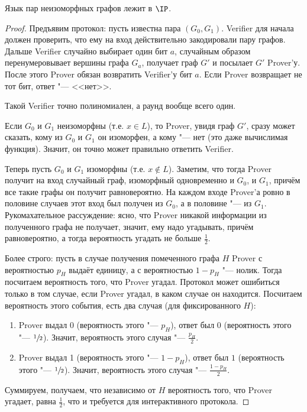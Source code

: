 	\begin{theorem}
		Язык пар неизоморфных графов лежит в $\IP$.
	\end{theorem}
	\begin{proof}
		Предъявим протокол: пусть известна пара $(G_0, G_1)$.
		Verifier для начала должен проверить, что ему на вход действительно закодировали пару графов.
		Дальше Verifier случайно выбирает один бит $a$, случайным образом перенумеровывает вершины графа $G_a$, получает граф $G'$ и посылает $G'$ Prover'у.
		После этого Prover обязан возвратить Verifier'у бит $a$.
		Если Prover возвращает не тот бит, ответ "--- <<нет>>.
		
		Такой Verifier точно полиномиален, а раунд вообще всего один.

		Если $G_0$ и $G_1$ неизоморфны (т.е. $x \in L$), то Prover, увидя граф $G'$, сразу может сказать, кому из $G_0$ и $G_1$ он изоморфен, а кому "--- нет (это даже вычислимая функция).
		Значит, он точно может правильно ответить Verifier.

		Теперь пусть $G_0$ и $G_1$ изоморфны (т.е. $x \notin L$).
		Заметим, что тогда Prover получит на вход случайный граф, изоморфный одновременно и $G_0$, и $G_1$, причём все такие графы он получит равновероятно.
		На каждом входе Prover'а ровно в половине случаев этот вход был получен из $G_0$, а в половине "--- из $G_1$.
		Рукомахательное рассуждение: ясно, что Prover никакой информации из полученного графа не получает, значит, ему надо угадывать, причём равновероятно, а тогда вероятность угадать не больше $\frac 12$.

		Более строго:
		пусть в случае получения помеченного графа $H$ Prover с вероятностью $p_{H}$ выдаёт единицу, а с вероятностью $1-p_{H}$ "--- нолик.
		Тогда посчитаем вероятность того, что Prover угадал.
		Протокол может ошибиться только в том случае, если Prover угадал, в каком случае он находится.
		Посчитаем вероятность этого события, есть два случая (для фиксированного $H$):
		\begin{enumerate}
			\item Prover выдал 0 (вероятность этого "--- $p_H$), ответ был $0$ (вероятность этого "--- $\sfrac 12$).
				Значит, вероятность этого случая "--- $\frac{p_H}{2}$.
			\item Prover выдал 1 (вероятность этого "--- $1-p_H$), ответ был $1$ (вероятность этого "--- $\sfrac 12$).
				Значит, вероятность этого случая "--- $\frac{1-p_H}{2}$.
		\end{enumerate}
		Суммируем, получаем, что независимо от $H$ вероятность того, что Prover угадает, равна $\frac 12$, что и требуется для интерактивного протокола.
	\end{proof}

